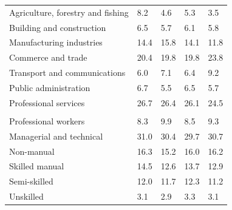 \documentclass{article}
\begin{document}
\begin{table}[h]
\begin{tabular}{KTTTT}
    \hline
Agriculture, forestry and fishing  & 8.2& 4.6& 5.3& 3.5\\
Building and construction & 6.5& 5.7& 6.1& 5.8\\
Manufacturing industries & 14.4& 15.8& 14.1& 11.8\\
Commerce and trade  & 20.4& 19.8& 19.8& 23.8\\
Transport and communications  & 6.0& 7.1& 6.4& 9.2\\
Public administration & 6.7& 5.5& 6.5& 5.7\\
Professional services & 26.7& 26.4& 26.1& 24.5\\
\hline
    \\ 
    \hline
Professional workers  & 8.3& 9.9 & 8.5& 9.3\\
Managerial and technical & 31.0& 30.4& 29.7& 30.7\\
Non-manual & 16.3& 15.2& 16.0& 16.2\\
Skilled manual & 14.5& 12.6& 13.7& 12.9\\
Semi-skilled & 12.0& 11.7& 12.3& 11.2\\
Unskilled  & 3.1& 2.9& 3.3& 3.1\\
\end{tabular}
\end{table}
\pagebreak
\end{document}
